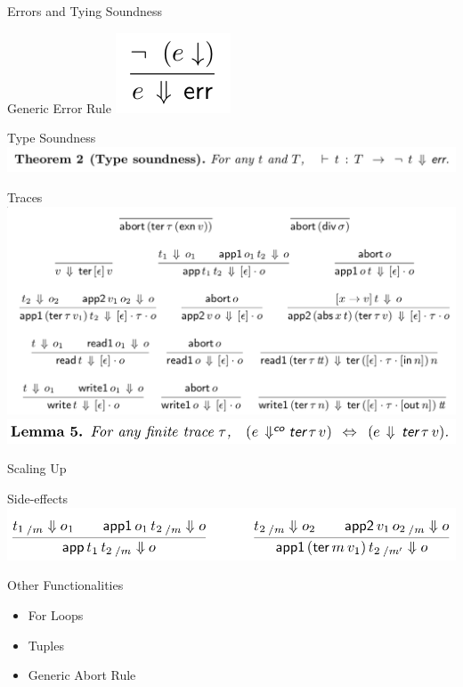 \documentclass[page number,dvipsnames]{beamer}
\begin{document}
\begin{frame}{Errors and Tying Soundness}
  \begin{block}{Generic Error Rule}
    \center
    \includegraphics[scale=0.3]{error.png}
  \end{block}
  \vfill
  \begin{exampleblock}{Type Soundness}
    \center
    \includegraphics[scale=0.3]{thm2.png}
  \end{exampleblock}
\end{frame}

\begin{frame}{Traces}
  \center
  \includegraphics[scale=0.25]{traces.png}
  \vfill
  \includegraphics[scale=0.3]{lemma5.png}
\end{frame}

\begin{frame}{Scaling Up}
  \begin{block}{Side-effects}
    \center
    \includegraphics[scale=0.3]{side_effect.png}
  \end{block}
  \vfill
  \begin{block}{Other Functionalities}
    \begin{itemize}
    \item For Loops
    \item Tuples
    \item Generic Abort Rule
    \end{itemize}
  \end{block}

\end{frame}
\end{document}
